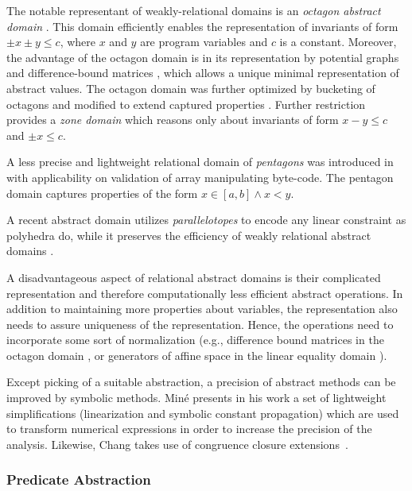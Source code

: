 The notable representant of weakly-relational domains is an \emph{octagon
abstract domain} \cite{Mine2006}. This domain efficiently enables the representation
of invariants of form $\pm x \pm y \leq c$, where $x$ and $y$ are program
variables and $c$ is a constant.  Moreover, the advantage of the octagon domain
is in its representation by potential graphs and difference-bound matrices
\cite{Larsen1997}, which allows a unique minimal representation of abstract
values.
The octagon domain was further optimized by bucketing of octagons
\cite{Blanchet2003, Venet2004} and modified to extend captured properties
\cite{Claris2004, Mine2004}. Further restriction provides a \emph{zone domain}
\cite{Mine2001} which reasons only about invariants of form $x - y \leq c$ and
$\pm x \leq c$.

A less precise and lightweight relational domain of \emph{pentagons} was introduced in~\cite{Logozzo2010} with applicability on validation of array manipulating
byte-code. The pentagon domain captures properties of the form $x \in [a,b]
\wedge x < y$.

A recent abstract domain utilizes \emph{parallelotopes} to encode any linear
constraint as polyhedra do, while it preserves the efficiency of weakly
relational abstract domains \cite{Amato2017}.

A disadvantageous aspect of relational abstract domains is their complicated
representation and therefore computationally less efficient abstract
operations. In addition to maintaining more properties about variables, the
representation also needs to assure uniqueness of the representation. Hence,
the operations need to incorporate some sort of normalization (e.g., difference
bound matrices in the octagon domain \cite{Mine2006}, or generators of affine
space in the linear equality domain \cite{Karr1976}).

Except picking of a suitable abstraction, a precision of abstract methods can
be improved by symbolic methods. Miné presents in his work \cite{Mine2006b} a
set of lightweight simplifications (linearization and symbolic constant
propagation) which are used to transform numerical expressions in order to
increase the precision of the analysis. Likewise, Chang takes use of congruence
closure extensions~\cite{Chang2005}.

\subsubsection{Predicate Abstraction}

